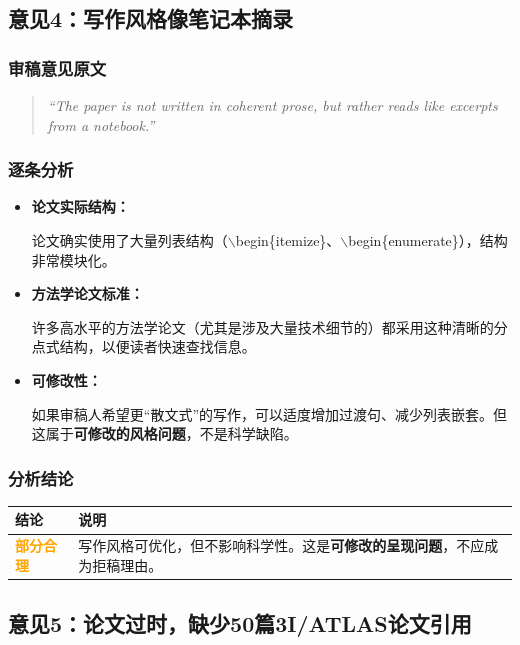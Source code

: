 \documentclass[12pt,a4paper]{article}
\begin{document}
\subsection{意见4：写作风格像笔记本摘录}

\subsubsection{审稿意见原文}
\begin{quote}
\textit{``The paper is not written in coherent prose, but rather reads like excerpts from a notebook.''}
\end{quote}

\subsubsection{逐条分析}

\begin{itemize}[leftmargin=*]
    \item \textbf{论文实际结构：}

    论文确实使用了大量列表结构（$\backslash$begin\{itemize\}、$\backslash$begin\{enumerate\}），结构非常模块化。

    \item \textbf{方法学论文标准：}

    许多高水平的方法学论文（尤其是涉及大量技术细节的）都采用这种清晰的分点式结构，以便读者快速查找信息。

    \item \textbf{可修改性：}

    如果审稿人希望更``散文式''的写作，可以适度增加过渡句、减少列表嵌套。但这属于\textbf{可修改的风格问题}，不是科学缺陷。
\end{itemize}

\subsubsection{分析结论}
\begin{center}
\begin{tabular}{|p{3cm}|p{10cm}|}
\hline
\rowcolor{gray!20}
\textbf{结论} & \textbf{说明} \\
\hline
\textcolor{orange}{\textbf{部分合理}} & 写作风格可优化，但不影响科学性。这是\textbf{可修改的呈现问题}，不应成为拒稿理由。 \\
\hline
\end{tabular}
\end{center}

\subsection{意见5：论文过时，缺少50篇3I/ATLAS论文引用}
\end{document}
